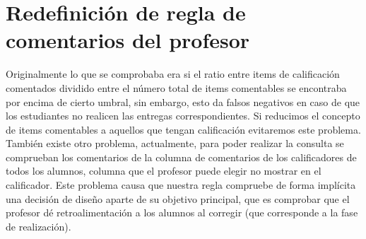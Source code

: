 \section{Redefinición de regla de comentarios del profesor}
Originalmente lo que se comprobaba era si el ratio entre items de calificación comentados dividido entre el número total de items comentables se encontraba por encima de cierto umbral, sin embargo, esto da falsos negativos en caso de que los estudiantes no realicen las entregas correspondientes. Si reducimos el concepto de items comentables a aquellos que tengan calificación evitaremos este problema. También existe otro problema, actualmente, para poder realizar la consulta se comprueban los comentarios de la columna de comentarios de los calificadores de todos los alumnos, columna que el profesor puede elegir no mostrar en el calificador. Este problema causa que nuestra regla compruebe de forma implícita una decisión de diseño aparte de su objetivo principal, que es comprobar que el profesor dé retroalimentación a los alumnos al corregir (que corresponde a la fase de realización).